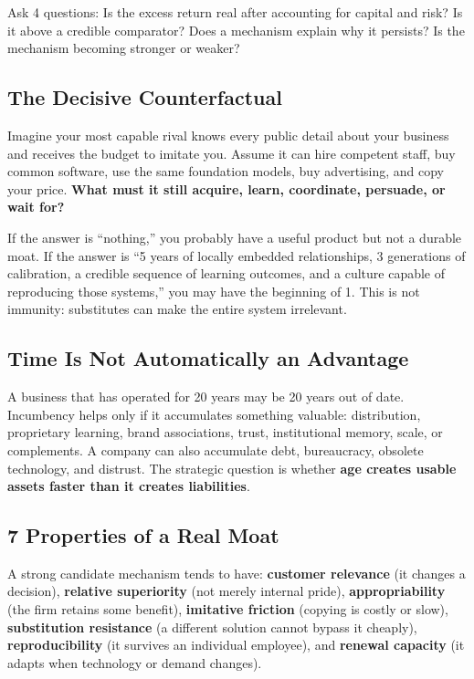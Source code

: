 Ask 4 questions: Is the excess return real after accounting for capital and risk? Is it above a credible comparator? Does a mechanism explain why it persists? Is the mechanism becoming stronger or weaker?

\subsection{The Decisive Counterfactual}
\label{sec:decisive_counterfactual}

Imagine your most capable rival knows every public detail about your business and receives the budget to imitate you. Assume it can hire competent staff, buy common software, use the same foundation models, buy advertising, and copy your price. \textbf{What must it still acquire, learn, coordinate, persuade, or wait for?}

If the answer is ``nothing,'' you probably have a useful product but not a durable moat. If the answer is ``5 years of locally embedded relationships, 3 generations of calibration, a credible sequence of learning outcomes, and a culture capable of reproducing those systems,'' you may have the beginning of 1. This is not immunity: substitutes can make the entire system irrelevant.

\subsection{Time Is Not Automatically an Advantage}
\label{sec:time_not_automatic_advantage}

A business that has operated for 20 years may be 20 years out of date. Incumbency helps only if it accumulates something valuable: distribution, proprietary learning, brand associations, trust, institutional memory, scale, or complements. A company can also accumulate debt, bureaucracy, obsolete technology, and distrust. The strategic question is whether \textbf{age creates usable assets faster than it creates liabilities}.

\subsection{7 Properties of a Real Moat}
\label{sec:seven_properties_real_moat}

A strong candidate mechanism tends to have: \textbf{customer relevance} (it changes a decision), \textbf{relative superiority} (not merely internal pride), \textbf{appropriability} (the firm retains some benefit), \textbf{imitative friction} (copying is costly or slow), \textbf{substitution resistance} (a different solution cannot bypass it cheaply), \textbf{reproducibility} (it survives an individual employee), and \textbf{renewal capacity} (it adapts when technology or demand changes).

